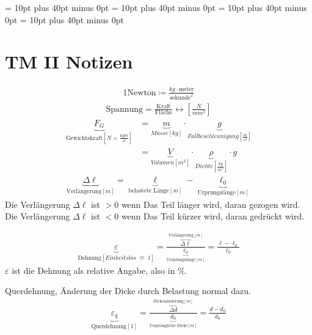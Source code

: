 \documentclass[11pt]{article}
\newcommand{\1}{ {\mathds{1}} }
\newcommand{\ueberschrift}{TM II Notizen}
\begin{document}
    \abovedisplayskip = 10pt plus 40pt minus 0pt
    \belowdisplayskip = 10pt plus 40pt minus 0pt
    \abovedisplayshortskip = 10pt plus 40pt minus 0pt
    \belowdisplayshortskip = 10pt plus 40pt minus 0pt
    \pagestyle{fancy}

    \section*{\ueberschrift}
    \begin{align*}
        1 \text{Newton} \coloneqq \frac{kg \cdot \text{meter}}{\text{sekunde}^2}
    \end{align*}
    \hrulefill
    \begin{align*}
        \text{Spannung} = \frac{\text{Kraft}}{\text{Fläche}} \leftrightarrow \left[\frac{N}{mm^2}\right]
    \end{align*}
    \hrulefill
    \begin{align*}
        \underbrace{F_G}_{\text{Gewichtskraft} [N = \frac{kg m}{s^2}]} &= \underbrace{m}_{Masse\left[kg\right]} \cdot \underbrace{g}_{Fallbeschleunigung \left[\frac{m}{s^2}\right]} \\ 
        &= \underbrace{V}_{Volumen\left[m^3\right]} \cdot \underbrace{\rho}_{Dichte\left[\frac{kg}{m^3}\right]} \cdot g
    \end{align*}
    \hrulefill
    \begin{align*}
        \underbrace{\Delta \ell}_{\text{Verlängerung}\left[m\right]} = \underbrace{\ell}_{\text{belastete Länge} \left[m\right]} - \underbrace{\ell_0}_{\text{Urprungslänge} \left[m\right]}
    \end{align*}
    Die Verlängerung $\Delta \ell$ ist $>0$ wenn Das Teil länger wird, daran gezogen wird.\\
    Die Verlängerung $\Delta \ell$ ist $<0$ wenn Das Teil kürzer wird, daran gedrückt wird.

    \hrulefill
    \begin{align*}
        \underbrace{\varepsilon}_{\text{Dehnung} \left[Einheitslos \; \widehat{=}\; 1\right]} 
        =
        \frac{\overbrace{\Delta \ell}^{\text{Verlängerung}\left[m\right]}}{\underbrace{\ell_0}_{\text{Ursprungslänge}\left[m\right]}}
        = \frac{\ell - \ell_0}{\ell_0}
    \end{align*}
    $\varepsilon$ ist die Dehnung als relative Angabe, also in \%.
    
    \hrulefill
    
    Querdehnung, Änderung der Dicke durch Belastung normal dazu.
    \begin{align*}
        \underbrace{\varepsilon_q}_{\text{Querdehnung} \left[1\right]} 
        =
        \frac{\overbrace{\Delta d}^{\text{Dickenänderung}\left[m\right]}}{\underbrace{d_0}_{\text{Ursprüngliche Dicke} \left[m\right]}}
        = \frac{d - d_0}{d_0}
    \end{align*}    
    \hrulefill
    
\end{document}
